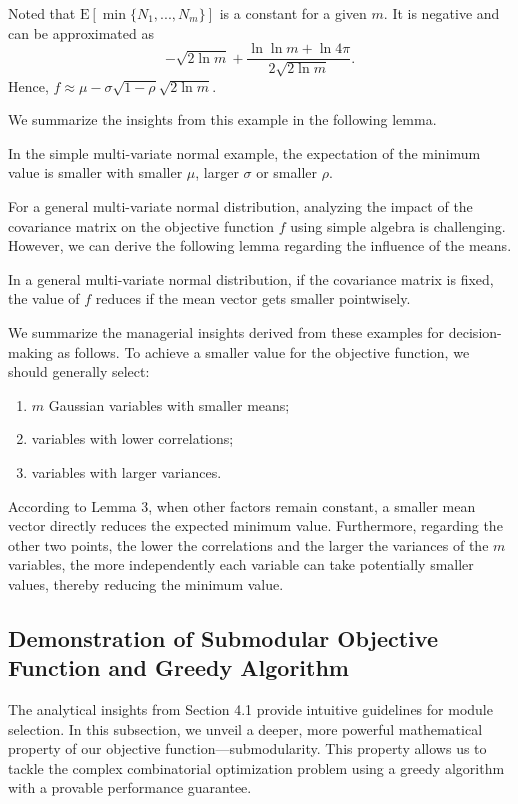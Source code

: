 \documentclass[opre,sglanonrev]{informs4}
\begin{document}
Noted that $\text{E}[\min\{N_1 ,...,N_m \}]$ is a constant for a given $m$. It is negative and can be approximated as 
$$-\sqrt{2 \ln m} + \frac{\ln \ln m + \ln 4\pi}{ 2 \sqrt{2 \ln m}}. $$
Hence, $f\approx \mu - \sigma\sqrt{1-\rho}\sqrt{2 \ln m}$. 

We summarize the insights from this example in the following lemma.

\begin{lemma}
	In the simple multi-variate normal example, the expectation of the minimum value is smaller with smaller $\mu$, larger $\sigma$ or smaller $\rho$.
\end{lemma}

For a general multi-variate normal distribution, analyzing the impact of the covariance matrix on the objective function $   f   $ using simple algebra is challenging. However, we can derive the following lemma regarding the influence of the means.
\begin{lemma}
	In a general multi-variate normal distribution, if the covariance matrix is fixed, the value of $f$ reduces if the mean vector gets smaller pointwisely.
\end{lemma}

We summarize the managerial insights derived from these examples for decision-making as follows. To achieve a smaller value for the objective function, we should generally select: 
\begin{enumerate}
	\item $m$ Gaussian variables with smaller means;
	\item variables with lower correlations;
	\item variables with larger variances.
\end{enumerate}
According to Lemma 3, when other factors remain constant, a smaller mean vector directly reduces the expected minimum value. Furthermore, regarding the other two points, the lower the correlations and the larger the variances of the $m$ variables, the more independently each variable can take potentially smaller values, thereby reducing the minimum value.

\subsection{Demonstration of Submodular Objective Function and Greedy Algorithm}
\label{submodular}

The analytical insights from Section 4.1 provide intuitive guidelines for module selection. In this subsection, we unveil a deeper, more powerful mathematical property of our objective function—submodularity. This property allows us to tackle the complex combinatorial optimization problem using a greedy algorithm with a provable performance guarantee.
\end{document}
